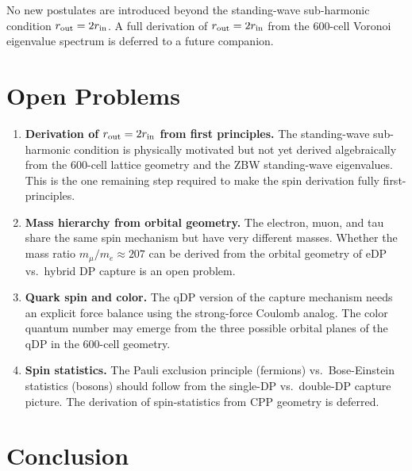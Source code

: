 \documentclass[12pt]{article}
\newcommand{\rin}{r_{\rm in}}
\newcommand{\rout}{r_{\rm out}}
\begin{document}
No new postulates are introduced beyond the standing-wave sub-harmonic
condition $\rout = 2\rin$.  A full derivation of $\rout = 2\rin$ from
the 600-cell Voronoi eigenvalue spectrum is deferred to a future
companion.

\section{Open Problems}
\label{sec:open}

\begin{enumerate}
  \item \textbf{Derivation of $\rout = 2\rin$ from first principles.}
    The standing-wave sub-harmonic condition is physically motivated but
    not yet derived algebraically from the 600-cell lattice geometry and
    the ZBW standing-wave eigenvalues.  This is the one remaining step
    required to make the spin derivation fully first-principles.

  \item \textbf{Mass hierarchy from orbital geometry.}  The electron,
    muon, and tau share the same spin mechanism but have very different
    masses.  Whether the mass ratio $m_\mu/m_e \approx 207$ can be derived
    from the orbital geometry of eDP vs.\ hybrid DP capture is an open
    problem.

  \item \textbf{Quark spin and color.}  The qDP version of the capture
    mechanism needs an explicit force balance using the strong-force
    Coulomb analog.  The color quantum number may emerge from the three
    possible orbital planes of the qDP in the 600-cell geometry.

  \item \textbf{Spin statistics.}  The Pauli exclusion principle
    (fermions) vs.\ Bose-Einstein statistics (bosons) should follow from
    the single-DP vs.\ double-DP capture picture.  The derivation of
    spin-statistics from CPP geometry is deferred.
\end{enumerate}

\section{Conclusion}
\label{sec:conclusion}
\end{document}

